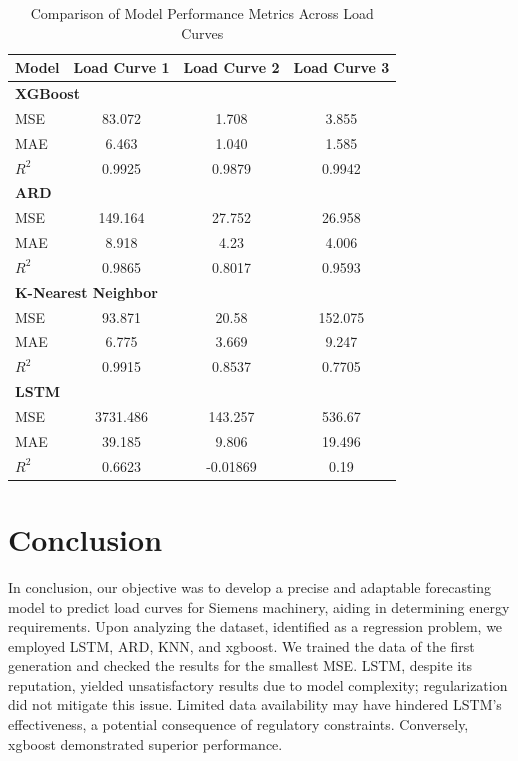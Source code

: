 \documentclass{article} %
\begin{document}
\begin{table}[ht]
\centering
\caption{Comparison of Model Performance Metrics Across Load Curves}
\label{tab:model_performance}
\begin{tabular}{@{\hspace{1em}}lccc}
\toprule
\textbf{Model} & \textbf{Load Curve 1} & \textbf{Load Curve 2} & \textbf{Load Curve 3} \\
\midrule
\multicolumn{4}{l}{\textbf{XGBoost}} \\
\midrule
MSE & 83.072 & 1.708 & 3.855 \\
MAE & 6.463 & 1.040 & 1.585 \\
$R^2$ & 0.9925 & 0.9879 & 0.9942 \\
\midrule
\multicolumn{4}{l}{\textbf{ARD}} \\
\midrule
MSE & 149.164 & 27.752 & 26.958 \\
MAE & 8.918 & 4.23 & 4.006 \\
$R^2$ & 0.9865 & 0.8017 & 0.9593 \\
\midrule
\multicolumn{4}{l}{\textbf{K-Nearest Neighbor}} \\
\midrule
MSE & 93.871 & 20.58 & 152.075 \\
MAE & 6.775 & 3.669 & 9.247 \\
$R^2$ & 0.9915 & 0.8537 & 0.7705 \\
\midrule
\multicolumn{4}{l}{\textbf{LSTM}} \\
\midrule
MSE & 3731.486 & 143.257 & 536.67 \\
MAE & 39.185 & 9.806 & 19.496 \\
$R^2$ & 0.6623 & -0.01869 & 0.19 \\
\bottomrule
\end{tabular}
\end{table}


\section{Conclusion}
In conclusion, our objective was to develop a precise and adaptable forecasting model to predict load curves for Siemens machinery, aiding in determining energy requirements. Upon analyzing the dataset, identified as a regression problem, we employed \gls{LSTM}, \gls{ARD}, \gls{KNN}, and \gls{xgboost}. We trained the data of the first generation and checked the results for the smallest \gls{MSE}. \gls{LSTM}, despite its reputation, yielded unsatisfactory results due to model complexity; regularization did not mitigate this issue. Limited data availability may have hindered \gls{LSTM}'s effectiveness, a potential consequence of regulatory constraints. Conversely, \gls{xgboost} demonstrated superior performance. 
\end{document}
